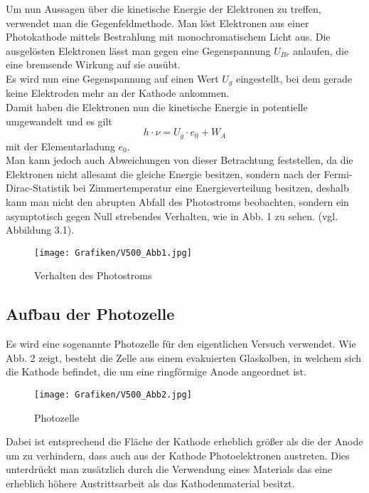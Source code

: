 Um nun Aussagen über die kinetische Energie der Elektronen zu treffen, verwendet man die Gegenfeldmethode. Man löst Elektronen aus einer Photokathode mittels Bestrahlung mit monochromatischem Licht aus. Die ausgelösten Elektronen lässt man gegen eine Gegenspannung $U_{Br}$ anlaufen, die eine bremsende Wirkung auf sie ausübt.\\
Es wird nun eine Gegenspannung auf einen Wert $U_g$ eingestellt, bei dem gerade keine Elektroden mehr an der Kathode ankommen.\\
Damit haben die Elektronen nun die kinetische Energie in potentielle umgewandelt und es gilt
\begin{equation}
\label{eq:Theorie_EnergieGleichung}
h \cdot \nu = U_{g} \cdot e_0 + W_A
\end{equation}
mit der Elementarladung $e_0$.\\

Man kann jedoch auch Abweichungen von dieser Betrachtung feststellen, da die Elektronen nicht allesamt die gleiche Energie besitzen, sondern nach der Fermi-Dirac-Statistik bei Zimmertemperatur eine Energieverteilung besitzen, deshalb kann man nicht den abrupten Abfall des Photostroms beobachten, sondern ein asymptotisch gegen Null strebendes Verhalten, wie in Abb. 1 zu sehen. (vgl. Abbildung 3.1).
\begin{figure}[h]
	\centering
	\texttt{[image: Grafiken/V500\_Abb1.jpg]}
	\caption{Verhalten des Photostroms\cite{V500}}
\end{figure}



\subsection{Aufbau der Photozelle}
Es wird eine sogenannte Photozelle für den eigentlichen Versuch verwendet. Wie Abb. 2 zeigt, besteht die Zelle aus einem evakuierten Glaskolben, in welchem sich die Kathode befindet, die um eine ringförmige Anode angeordnet ist.\\

\begin{figure}[h]
	\centering
	\texttt{[image: Grafiken/V500\_Abb2.jpg]}
	\caption{Photozelle\cite{V500}}
\end{figure}
Dabei ist entsprechend die Fläche der Kathode erheblich größer als die der Anode um zu verhindern, dass auch aus der Kathode Photoelektronen austreten. Dies unterdrückt man zusätzlich durch die Verwendung eines Materials das eine erheblich höhere Austrittsarbeit als das Kathodenmaterial besitzt.\\

